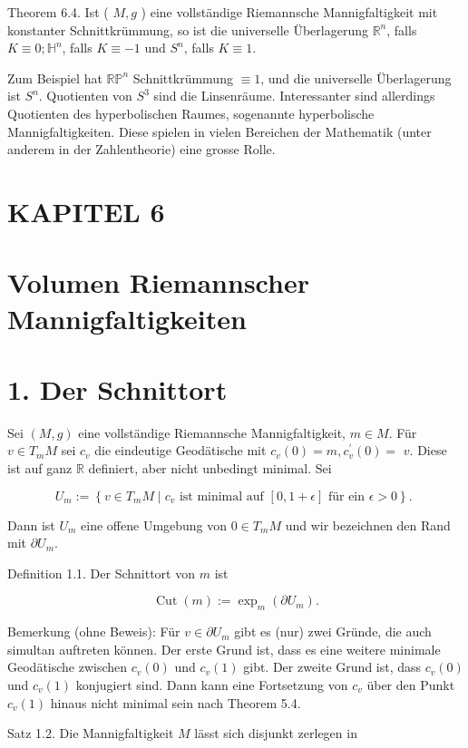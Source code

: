 \documentclass[10pt]{article}
\begin{document}
Theorem 6.4. Ist ( $M, g$ ) eine vollständige Riemannsche Mannigfaltigkeit mit konstanter Schnittkrümmung, so ist die universelle Überlagerung $\mathbb{R}^{n}$, falls $K \equiv 0 ; \mathbb{H}^{n}$, falls $K \equiv-1$ und $S^{n}$, falls $K \equiv 1$.

Zum Beispiel hat $\mathbb{R P}^{n}$ Schnittkrümmung $\equiv 1$, und die universelle Überlagerung ist $S^{n}$. Quotienten von $S^{3}$ sind die Linsenräume. Interessanter sind allerdings Quotienten des hyperbolischen Raumes, sogenannte hyperbolische Mannigfaltigkeiten. Diese spielen in vielen Bereichen der Mathematik (unter anderem in der Zahlentheorie) eine grosse Rolle.

\section*{KAPITEL 6}
\section*{Volumen Riemannscher Mannigfaltigkeiten}
\section*{1. Der Schnittort}
Sei $(M, g)$ eine vollständige Riemannsche Mannigfaltigkeit, $m \in M$. Für $v \in T_{m} M$ sei $c_{v}$ die eindeutige Geodätische mit $c_{v}(0)=m, c_{v}^{\prime}(0)=$ $v$. Diese ist auf ganz $\mathbb{R}$ definiert, aber nicht unbedingt minimal. Sei

$$
U_{m}:=\left\{v \in T_{m} M \mid c_{v} \text { ist minimal auf }[0,1+\epsilon] \text { für ein } \epsilon>0\right\} \text {. }
$$

Dann ist $U_{m}$ eine offene Umgebung von $0 \in T_{m} M$ und wir bezeichnen den Rand mit $\partial U_{m}$.

Definition 1.1. Der Schnittort von $m$ ist

$$
\operatorname{Cut}(m):=\exp _{m}\left(\partial U_{m}\right) .
$$

Bemerkung (ohne Beweis): Für $v \in \partial U_{m}$ gibt es (nur) zwei Gründe, die auch simultan auftreten können. Der erste Grund ist, dass es eine weitere minimale Geodätische zwischen $c_{v}(0)$ und $c_{v}(1)$ gibt. Der zweite Grund ist, dass $c_{v}(0)$ und $c_{v}(1)$ konjugiert sind. Dann kann eine Fortsetzung von $c_{v}$ über den Punkt $c_{v}(1)$ hinaus nicht minimal sein nach Theorem 5.4.

Satz 1.2. Die Mannigfaltigkeit $M$ lässt sich disjunkt zerlegen in
\end{document}
